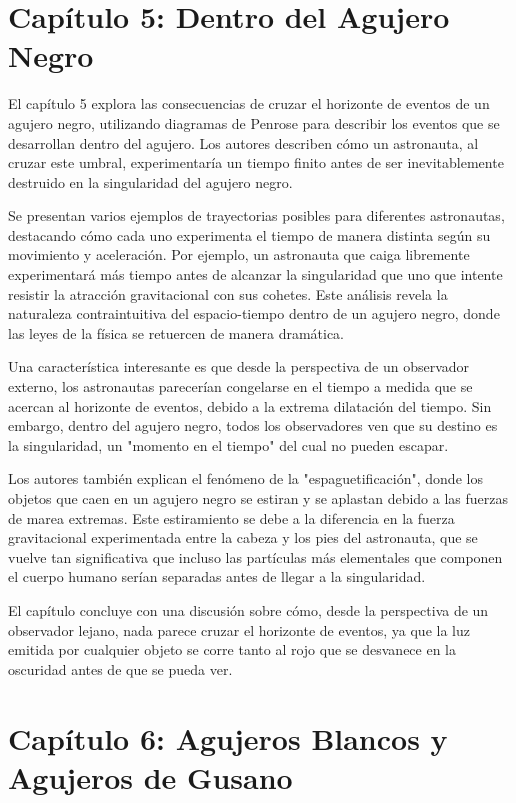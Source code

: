\documentclass{article}
\begin{document}
\section*{Capítulo 5: Dentro del Agujero Negro}

El capítulo 5 explora las consecuencias de cruzar el horizonte de eventos de un agujero negro, utilizando diagramas de Penrose para describir los eventos que se desarrollan dentro del agujero. Los autores describen cómo un astronauta, al cruzar este umbral, experimentaría un tiempo finito antes de ser inevitablemente destruido en la singularidad del agujero negro.

Se presentan varios ejemplos de trayectorias posibles para diferentes astronautas, destacando cómo cada uno experimenta el tiempo de manera distinta según su movimiento y aceleración. Por ejemplo, un astronauta que caiga libremente experimentará más tiempo antes de alcanzar la singularidad que uno que intente resistir la atracción gravitacional con sus cohetes. Este análisis revela la naturaleza contraintuitiva del espacio-tiempo dentro de un agujero negro, donde las leyes de la física se retuercen de manera dramática.

Una característica interesante es que desde la perspectiva de un observador externo, los astronautas parecerían congelarse en el tiempo a medida que se acercan al horizonte de eventos, debido a la extrema dilatación del tiempo. Sin embargo, dentro del agujero negro, todos los observadores ven que su destino es la singularidad, un "momento en el tiempo" del cual no pueden escapar.

Los autores también explican el fenómeno de la "espaguetificación", donde los objetos que caen en un agujero negro se estiran y se aplastan debido a las fuerzas de marea extremas. Este estiramiento se debe a la diferencia en la fuerza gravitacional experimentada entre la cabeza y los pies del astronauta, que se vuelve tan significativa que incluso las partículas más elementales que componen el cuerpo humano serían separadas antes de llegar a la singularidad.

El capítulo concluye con una discusión sobre cómo, desde la perspectiva de un observador lejano, nada parece cruzar el horizonte de eventos, ya que la luz emitida por cualquier objeto se corre tanto al rojo que se desvanece en la oscuridad antes de que se pueda ver.

\section*{Capítulo 6: Agujeros Blancos y Agujeros de Gusano}
\end{document}
